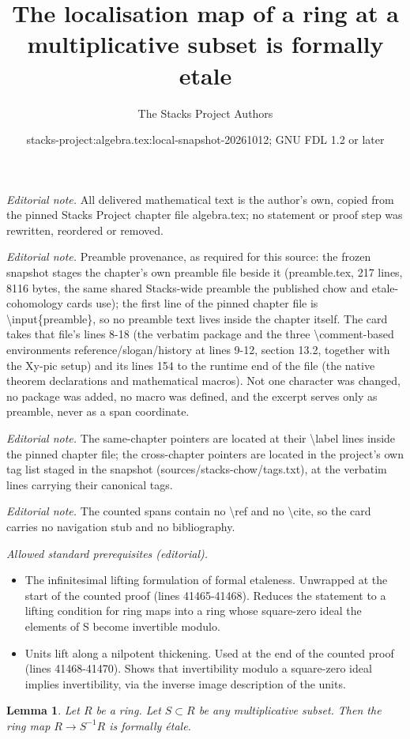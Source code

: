 \documentclass[10pt,a4paper]{amsart}
\title{The localisation map of a ring at a multiplicative subset is formally etale}
\author{The Stacks Project Authors}
\date{stacks-project:algebra.tex:local-snapshot-20261012; GNU FDL 1.2 or later}
\theoremstyle{plain}
\newtheorem{lemma}[subsection]{Lemma}
\theoremstyle{definition}
\theoremstyle{remark}
\numberwithin{equation}{subsection}
\begin{document}
\maketitle
\noindent\textit{Editorial note.} All delivered mathematical text is the author's own, copied from the pinned Stacks Project chapter file algebra.tex; no statement or proof step was rewritten, reordered or removed.\par\medskip
\noindent\textit{Editorial note.} Preamble provenance, as required for this source: the frozen snapshot stages the chapter's own preamble file beside it (preamble.tex, 217 lines, 8116 bytes, the same shared Stacks-wide preamble the published chow and etale-cohomology cards use); the first line of the pinned chapter file is \textbackslash{}input\{preamble\}, so no preamble text lives inside the chapter itself. The card takes that file's lines 8-18 (the verbatim package and the three \textbackslash{}comment-based environments reference/slogan/history at lines 9-12, section 13.2, together with the Xy-pic setup) and its lines 154 to the runtime end of the file (the native theorem declarations and mathematical macros). Not one character was changed, no package was added, no macro was defined, and the excerpt serves only as preamble, never as a span coordinate.\par\medskip
\noindent\textit{Editorial note.} The same-chapter pointers are located at their \textbackslash{}label lines inside the pinned chapter file; the cross-chapter pointers are located in the project's own tag list staged in the snapshot (sources/stacks-chow/tags.txt), at the verbatim lines carrying their canonical tags.\par\medskip
\noindent\textit{Editorial note.} The counted spans contain no \textbackslash{}ref and no \textbackslash{}cite, so the card carries no navigation stub and no bibliography.\par\medskip
\noindent\textit{Allowed standard prerequisites (editorial).}\begin{itemize}
\item The infinitesimal lifting formulation of formal etaleness. Unwrapped at the start of the counted proof (lines 41465-41468). Reduces the statement to a lifting condition for ring maps into a ring whose square-zero ideal the elements of S become invertible modulo.
\item Units lift along a nilpotent thickening. Used at the end of the counted proof (lines 41468-41470). Shows that invertibility modulo a square-zero ideal implies invertibility, via the inverse image description of the units.
\end{itemize}\medskip
\begin{lemma}
\label{lemma-localization-formally-etale}
Let $R$ be a ring. Let $S \subset R$ be any multiplicative subset.
Then the ring map $R \to S^{-1}R$ is formally \'etale.
\end{lemma}
\end{document}
